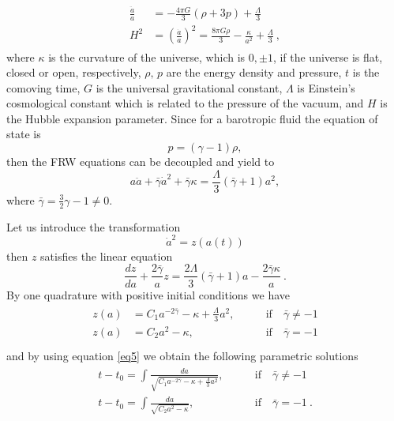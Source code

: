 \documentclass[
showkeys,
preprintnumbers,amsmath,amssymb,APS]{revtex4}
\begin{document}
\begin{eqnarray}\label{eq1}
\begin{array}{lll}
\frac{\ddot{a}}{a}&=-\frac{4\pi G}{3}\left(\rho+3p\right)+\frac{\Lambda}{3}\\
H^2&=\left(\frac{\dot{a}}{a}\right)^2=\frac{8\pi G \rho}{3}-\frac{\kappa}{a^2} +\frac{\Lambda}{3}~,
\end{array}
\end{eqnarray}
where $\kappa$ is the curvature of the universe, which is $0, \pm1$, if the universe is flat, closed or open, respectively,  $\rho, \,p$ are the energy density and pressure, $t$ is the comoving time, $G$ is the universal gravitational constant, $\Lambda$ is Einstein\rq{}s cosmological constant which is related to the pressure of the vacuum, and $H$ is the Hubble  expansion parameter. Since for a barotropic fluid the equation of state is
\begin{equation}\label{eq2}
p=(\gamma-1)\rho,
\end{equation}
then the FRW equations can be decoupled and yield to
\begin{equation}\label{eq3}
a \ddot a+\bar{\gamma}\dot a ^2+ \bar \gamma \kappa=\frac{\Lambda}{3} (\bar \gamma+1)a^2,
\end{equation}
where $\bar \gamma=\frac 3 2 \gamma-1 \ne 0$.

Let us introduce the transformation 
\begin{equation}\label{eq5}
\dot a^2=z\left(a(t)\right)
\end{equation}
then $z$ satisfies the linear equation
\begin{equation}\label{eq6}
\frac{dz}{da}+\frac{2\bar \gamma}{a}z=\frac {2\Lambda}{ 3}(\bar \gamma+1)a-\frac{2 \bar \gamma \kappa}{a}~.
\end{equation}
By one quadrature with positive initial conditions we have
\begin{eqnarray}\label{eq7}
\begin{array}{lll}
z(a)&=C_1a^{-2 \bar \gamma}-\kappa+\frac{\Lambda}{3}a^2, \qquad &  \mathrm{if} \quad \bar{\gamma}\ne -1\\
z(a)&=C_2a^2-\kappa, \qquad & \mathrm{if} \quad  \bar{\gamma}= -1\\
\end{array}
\end{eqnarray}
and by using equation \eqref{eq5} we obtain the following parametric solutions
\begin{eqnarray}\label{eq9}
\begin{array}{lll}
 {\displaystyle t-t_0=\int {\frac{da}{\sqrt{C_1a^{-2 \bar \gamma}-\kappa+\frac{\Lambda}{3}a^2}}}}, \qquad &  \mathrm{if} \quad \bar{\gamma}\ne -1\\
{\displaystyle t-t_0=\int {\frac{da}{\sqrt{C_2a^2-\kappa}}}}, \qquad & \mathrm{if} \quad  \bar{\gamma}= -1~.\\
\end{array}
\end{eqnarray}
\end{document}
